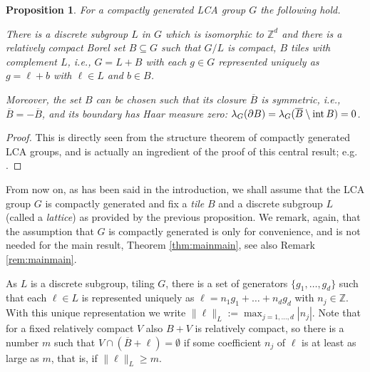 \documentclass[[a4paper,english,12pt]{amsart}
\theoremstyle{plain}
\newtheorem{proposition}[theorem]{Proposition}
\theoremstyle{remark}
\newcommand{\intt}{\mbox{\rm int\,}}
\newcommand{\ZZ}{\mathbb Z}
\def\haar{\lambda}
\begin{document}
 \begin{proposition}\label{prop:compact tile} For a compactly generated LCA group $G$ the following hold.

There is a  discrete subgroup $L$ in $G$ which is isomorphic to $\ZZ^d$ and there is a relatively compact Borel set $B\subseteq G$ such that $G/L$ is compact, $B$ tiles with complement $L$, i.e., $G=L+B$ with each $g\in G$ represented uniquely as $g=\ell+b$ with $\ell\in L$ and $b\in B$.

Moreover, the set $B$ can be chosen such that its closure $\overline{B}$ is symmetric, i.e., $\overline{B}=-\overline{B}$, and its boundary has Haar measure zero: $\haar_G(\partial B)= \haar_G(\overline{B} \setminus \intt B)=0$.
\end{proposition}
\begin{proof}This is directly seen from the structure theorem of compactly generated LCA groups, and is actually an ingredient of the proof of this central result; e.g. \cite[2.4.2 Lemma]{rudin}.
\end{proof}


From now on, as has been said in the introduction, we shall assume that the LCA group $G$ is compactly generated and fix a \emph{tile} $B$ and a  discrete subgroup $L$ (called a  \emph{lattice}) as provided by the previous proposition. We remark, again, that the assumption that $G$ is compactly generated is only for convenience, and is not needed for the main result, Theorem \ref{thm:mainmain}, see also Remark \ref{rem:mainmain}.

As $L$ is a discrete subgroup,  tiling $G$, there is a set of generators $\{g_1,\ldots,g_d\}$ such that each $\ell\in L$ is represented uniquely as $\ell=n_1g_1+\dots+n_d g_d$ with $n_j\in\ZZ$. With this unique representation we write $\|\ell\|_L:=\max_{j=1,\ldots,d} |n_j|$. Note that for a fixed  relatively compact $V$ also $B+V$ is relatively compact, so there is a number $m$ such that $V \cap (\overline{B}+\ell) = \emptyset$ if some coefficient $n_j$ of $\ell$ is at least as large as $m$, that is, if $\|\ell\|_L \ge m$.
\end{document}
